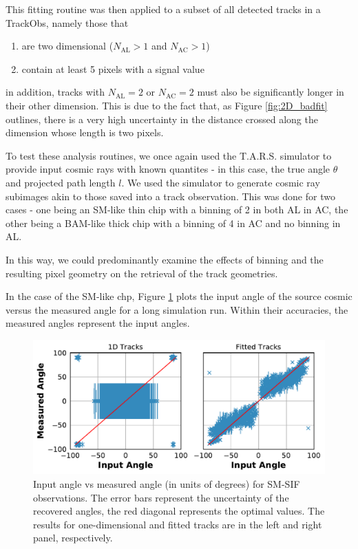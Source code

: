 \documentclass[a4paper, 11pt]{article}
\begin{document}
This fitting routine was then applied to a subset of all detected tracks in a TrackObs, namely those that
\begin{enumerate}
  \item are two dimensional ($N_\mathrm{AL} > 1$ and $N_\mathrm{AC} > 1$)
  \item contain at least 5 pixels with a signal value
\end{enumerate}

in addition, tracks with $N_\mathrm{AL} = 2$ or $N_\mathrm{AC} = 2$ must also be significantly longer in their other dimension. This is due to the fact that, as Figure \ref{fig:2D_badfit} outlines, there is a very high uncertainty in the distance crossed along the dimension whose length is two pixels.

To test these analysis routines, we once again used the T.A.R.S. simulator to provide input cosmic rays with known quantites - in this case, the true angle $\theta$ and projected path length $l$. We used the simulator to generate cosmic ray subimages akin to those saved into a track observation. This was done for two cases - one being an SM-like thin chip with a binning of 2 in both AL in AC, the other being a BAM-like thick chip with a binning of 4 in AC and no binning in AL.

In this way, we could predominantly examine the effects of binning and the resulting pixel geometry on the retrieval of the track geometries.

In the case of the SM-like chp, Figure \ref{fig:AngleDist_SM} plots the input angle of the source cosmic versus the measured angle for a long simulation run. Within their accuracies, the measured angles represent the input angles.

\begin{figure}[!h]
  \centering
  \includegraphics[width=\textwidth]{images/postprocessing/AngleDist_SM}
  \caption{Input angle vs measured angle (in units of degrees) for SM-SIF observations. The error bars represent the uncertainty of the recovered angles, the red diagonal represents the optimal values. The results for one-dimensional and fitted tracks are in the left and right panel, respectively.}
  \label{fig:AngleDist_SM}
\end{figure}
\end{document}
